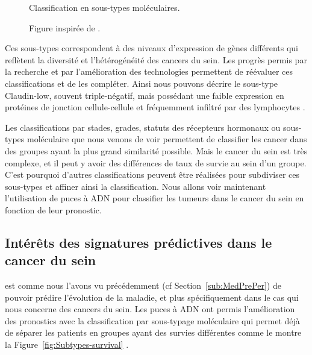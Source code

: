 			\begin{figure}
				\centering
				\def\svgwidth{\columnwidth}
				
				\caption{Classification en sous-types moléculaires.}
				\label{fig:Subtypes}
				\caption*{Figure inspirée de \citeauthor{Perou2000,Sorlie2001}.}
			\end{figure}

			\pagebreak

			Ces sous-types correspondent à des niveaux d'expression de gènes différents qui reflètent la diversité et l'hétérogénéité des cancers du sein.
			Les progrès permis par la recherche et par l'amélioration des technologies permettent de réévaluer ces classifications et de les compléter.
			Ainsi nous pouvons décrire le sous-type Claudin-low, souvent triple-négatif, mais possédant une faible expression en protéines de jonction cellule-cellule et fréquemment infiltré par des lymphocytes \citep{Miles2010,Harrell2013}.

			Les classifications par stades, grades, statuts des récepteurs hormonaux ou sous-types moléculaire que nous venons de voir permettent de classifier les cancer dans des groupes ayant la plus grand similarité possible.
			Mais le cancer du sein est très complexe, et il peut y avoir des différences de taux de survie au sein d'un groupe.
			C'est pourquoi d'autres classifications peuvent être réalisées pour subdiviser ces sous-types et affiner ainsi la classification.
			Nous allons voir maintenant l'utilisation de puces à \acs{ADN} pour classifier les tumeurs dans le cancer du sein en fonction de leur pronostic.

		\subsection{\textcolor{red!45!black}{Intérêts des signatures prédictives dans le cancer du sein}}

			 est comme nous l'avons vu précédemment (cf Section~\ref{sub:MedPrePer}) de pouvoir prédire l'évolution de la maladie, et plus spécifiquement dans le cas qui nous concerne des cancers du sein. Les puces à \acs{ADN} ont permis l'amélioration des pronostics avec la classification par sous-typage moléculaire qui permet déjà de séparer les patients en groupes ayant des survies différentes comme le montre la Figure~\ref{fig:Subtypes-survival} \citep{Perou2000,Sorlie2001,Hu2006}.

